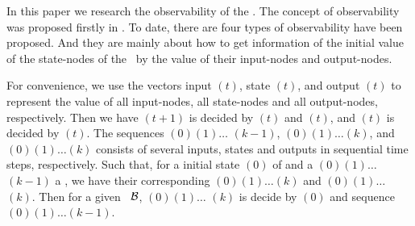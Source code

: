 In this paper we research the observability of the \BCNs. The concept of observability was proposed firstly in \cite{cheng2009controllability}. To date, there are four types of observability have been proposed. And they are mainly about how to get  information of the initial value of the state-nodes of the \BCNs\ by the value of their input-nodes and output-nodes. 

For convenience, we use the vectors input \Input$(t)$, state \State$(t)$, and output \Output$(t)$ to represent the value of all input-nodes, all state-nodes and all output-nodes, respectively. Then we have \State$(t+1)$ is decided by \Input$(t)$ and \State$(t)$, and \Output$(t)$ is decided by \State$(t)$.
 The sequences \Input$(0)$\Input$(1)\ldots$
\Input$(k-1)$,  \State$(0) $\State$(1)\ldots$\State$(k)$, and \Output$(0)$\Output$(1)\ldots$\Output$(k)$ 
 consists of several inputs, states and outputs  in sequential time steps,  respectively. 
 Such that, for a initial state \State$(0)$ of and a \Input$(0)$\Input$(1)\ldots$\Input$(k-1)$ a \BCN, we have their corresponding 
\State$(0) $\State$(1)\ldots $\State$(k)$ and \Output$(0) $\Output$(1)\ldots$ \Output$(k)$.  
Then for a given  \BCN\  ${\mathcal{B}}$,  \Output$(0) $\Output$(1)\ldots$ \Output$(k)$ is decide by
\State$(0)$ and sequence \Input$(0)$\Input$(1)\ldots$\Input$(k-1)$. 
 
